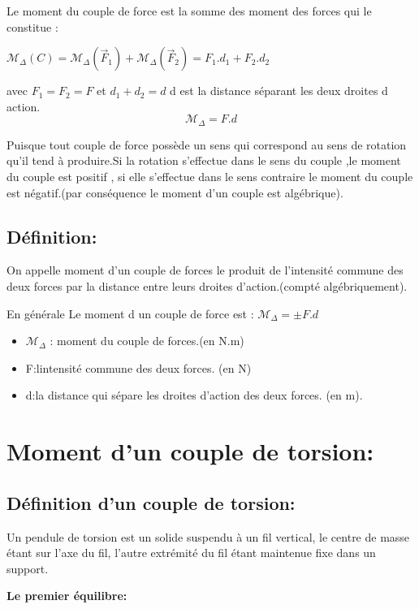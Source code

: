 \documentclass[12pt]{article}
\begin{document}
Le moment du couple de force est la somme des moment des forces qui le constitue :

$\mathscr{M}_{\Delta}(C) = \mathscr{M}_{\Delta}(\vec{F}_1) + \mathscr{M}_{\Delta}(\vec{F}_2) = F_1.d_1 + F_2.d_2$

avec $F_1 = F_2 = F$ et $d_1 + d_2 = d$ d est la distance séparant les deux droites d action.
$$
  \mathscr{M}_\Delta = F.d
$$

Puisque tout couple de force possède un sens qui correspond au sens de rotation qu'il tend à produire.Si la rotation s'effectue
dans le sens du couple ,le moment du couple est positif , si elle s'effectue dans le sens contraire le moment du couple est
négatif.(par conséquence le moment d'un couple est algébrique).

\subsection{ Définition: }
On appelle moment d'un couple de forces le produit de l'intensité commune des deux forces par la distance entre leurs
droites d'action.(compté algébriquement).


En générale Le moment d un couple de force est : $\mathscr{M}_\Delta =\pm F.d$

\begin{itemize}
	\item  $\mathscr{M}_\Delta$ :  moment du couple de forces.(en N.m)
	\item F:lintensité commune des deux forces. (en N)

	\item d:la distance qui sépare les droites d'action des deux forces. (en m).

\end{itemize}


\section{Moment d'un couple de torsion:}
\subsection{Définition d'un couple de torsion:}


Un pendule de torsion est un solide suspendu à un fil vertical, le centre de masse étant sur l'axe du fil, l'autre
extrémité du fil étant maintenue fixe dans un support.


\textbf{Le premier équilibre:} 
\end{document}
